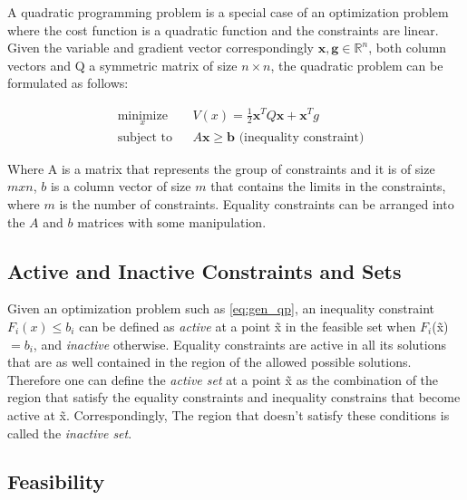 A quadratic programming problem is a special case of an optimization problem where the cost function is a quadratic function and the constraints are linear. Given the variable  and gradient vector correspondingly $\mathbf{x}, \mathbf{g} \in \mathbb{R}^{n}$, both column vectors and Q a symmetric matrix of size $n \times n$, the quadratic problem can be formulated as follows: 

\begin{equation} \label{eq:quadproblem}
 \begin{aligned}
 & \underset{x}{\text{minimize}}
 & & V(x) = \frac{1}{2} \mathbf{x}^T Q \mathbf{x} + \mathbf{x}^T g \\
 & \text{subject to} 
 & & A\mathbf{x} \geq \mathbf b \mbox{  (inequality constraint)}
 \end{aligned}
\end{equation}

Where A is a matrix that represents the group of constraints and it is of size $m x n$, $b$ is a column vector of size $m$ that contains the limits in the constraints, where $m$ is the number of constraints. Equality constraints can be arranged into the $A$ and $b$ matrices with some manipulation.

\subsection{Active and Inactive Constraints and Sets}%

Given an optimization problem such as \ref{eq:gen_qp}, an inequality constraint $F_{i}(x) \leq b_{i}$ can be defined as \emph{active} at a point \~{x} in the feasible set when $F_{i} $(\~{x})$ = b_{i}$, and \emph{inactive} otherwise. Equality constraints are active in all its solutions that are as well contained in the region of the allowed possible solutions.\\

Therefore one can define the \emph{active set} at a point \~{x} as the combination of the region that satisfy the equality constraints and inequality constrains that become active at \~{x}. Correspondingly, The region that doesn't satisfy these conditions is called the \emph{inactive set}.

\subsection{Feasibility}%

